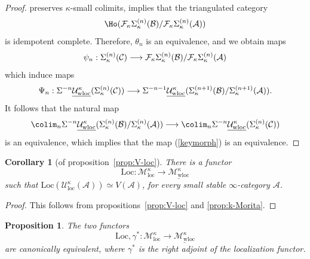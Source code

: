 \documentclass{amsart}
\renewcommand{\to}{\mathchoice{\longrightarrow}{\rightarrow}{\rightarrow}{\rightarrow}}
\newcommand{\cA}{{\mathcal A}}
\newcommand{\cB}{{\mathcal B}}
\newcommand{\cF}{{\mathcal F}}
\newcommand{\cM}{{\mathcal M}}
\newcommand{\cU}{{\mathcal U}}
\let\catsymbfont\mathcal
\newcommand{\aA}{{\catsymbfont{A}}}
\newcommand{\aB}{{\catsymbfont{B}}}
\newcommand{\aC}{{\catsymbfont{C}}}
\newcommand{\too}{\longrightarrow}%
\renewcommand{\i}{\infty}
\newcommand{\uwMotloc}{\underline{\cM_{\mathrm{wloc}}^\kappa}}
\newcommand{\wMotloc}{\cM_{\mathrm{loc}}^\kappa}
\newcommand{\uwUloc}{\underline{\cU_{\mathrm{wloc}}^\kappa}}
\newcommand{\wUloc}{\cU_{\mathrm{loc}}^\kappa}
\newcommand{\kcone}{\cF_{\kappa}}
\newcommand{\ksusp}{\Sigma_{\kappa}}
\numberwithin{equation}{section}
\newtheorem{corollary}[equation]{Corollary}
\newtheorem{proposition}[equation]{Proposition}
\theoremstyle{definition}
\begin{document}
\begin{proof}
preserves $\kappa$-small colimits, \cite[\S3.1]{Marco} implies that
the triangulated category
$$ \Ho (\kcone\ksusp^{(n)}(\cB) / \kcone\ksusp^{(n)}(\cA) )$$
is idempotent complete. Therefore, $\theta_n$ is an
equivalence, and we obtain maps
\[
\psi_n:\Sigma_\kappa^{(n)}(\aC)\to\kcone\Sigma_\kappa^{(n)}(\aB)/\kcone\Sigma_\kappa^{(n)}(\aA)
\]
which induce maps
\[
\Psi_n:\Sigma^{-n}\uwUloc(\Sigma_\kappa^{(n)}(\aC))\to\Sigma^{-n-1}\uwUloc(\Sigma_\kappa^{(n+1)}(\aB)/\Sigma^{(n+1)}_\kappa(\aA)).
\]
It follows that the natural map
\[
\colim_n\Sigma^{-n}\uwUloc(\Sigma_\kappa^{(n)}(\aB)/\Sigma_\kappa^{(n)}(\aA))\to\colim_n\Sigma^{-n}\uwUloc(\Sigma_\kappa^{(n)}(\aC))
\]
is an equivalence, which implies that the map (\ref{keymorph}) is an equivalence.
\end{proof}

\begin{corollary}[of proposition~\ref{prop:V-loc}]\label{cor:V-loc}
There is a functor $$ \mathrm{Loc}: \wMotloc \too \uwMotloc$$ such
that $\mathrm{Loc}(\wUloc(\cA)) \simeq V(\cA)$, for every small stable
$\i$-category $\cA$.
\end{corollary}

\begin{proof}
This follows from propositions~\ref{prop:V-loc} and \ref{prop:k-Morita}.
\end{proof}
\begin{proposition}\label{prop:can-isom}
The two functors
\[
\mathrm{Loc}, \gamma^{\ast} \colon \wMotloc \too \uwMotloc
\]
are canonically equivalent, where $\gamma^{\ast}$ is the right adjoint
of the localization functor. 
\end{proposition}
\end{document}
